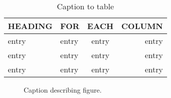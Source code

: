 \documentclass{iucr}              %
\begin{document}
\begin{references}
\end{references}



\begin{table}
\caption{Caption to table}
\begin{tabular}{llcr}      %
 HEADING    & FOR        & EACH       & COLUMN     \\
\hline
 entry      & entry      & entry      & entry      \\
 entry      & entry      & entry      & entry      \\
 entry      & entry      & entry      & entry      \\
\end{tabular}
\end{table}





\begin{figure}
\caption{Caption describing figure.}
\end{figure}
\end{document}
